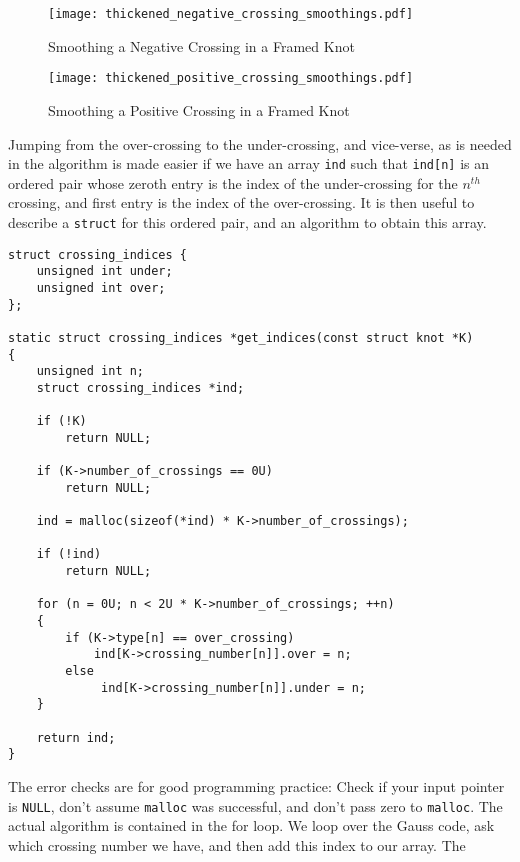 \documentclass{article}
\theoremstyle{plain}
\begin{document}
        \begin{figure}
            \centering
            \texttt{[image: thickened\_negative\_crossing\_smoothings.pdf]}
            \caption{Smoothing a Negative Crossing in a Framed Knot}
            \label{fig:thickened_negative_crossing_smoothings}
        \end{figure}
        \begin{figure}
            \centering
            \texttt{[image: thickened\_positive\_crossing\_smoothings.pdf]}
            \caption{Smoothing a Positive Crossing in a Framed Knot}
            \label{fig:thickened_positive_crossing_smoothings}
        \end{figure}
        Jumping from the over-crossing to the under-crossing, and vice-verse,
        as is needed in the algorithm is made easier if we have an array
        \texttt{ind} such that \texttt{ind[n]} is an ordered pair whose
        zeroth entry is the index of the under-crossing for the $n^{th}$
        crossing, and first entry is the index of the over-crossing. It is then
        useful to describe a \texttt{struct} for this ordered pair, and an
        algorithm to obtain this array.
\begin{lstlisting}[style=CStyle]
struct crossing_indices {
    unsigned int under;
    unsigned int over;
};

static struct crossing_indices *get_indices(const struct knot *K)
{
    unsigned int n;
    struct crossing_indices *ind;

    if (!K)
        return NULL;

    if (K->number_of_crossings == 0U)
        return NULL;

    ind = malloc(sizeof(*ind) * K->number_of_crossings);

    if (!ind)
        return NULL;

    for (n = 0U; n < 2U * K->number_of_crossings; ++n)
    {
        if (K->type[n] == over_crossing)
            ind[K->crossing_number[n]].over = n;
        else
             ind[K->crossing_number[n]].under = n;
    }

    return ind;
}
\end{lstlisting}
        The error checks are for good programming practice: Check if your
        input pointer is \texttt{NULL}, don't assume \texttt{malloc} was
        successful, and don't pass zero to \texttt{malloc}. The actual algorithm
        is contained in the for loop. We loop over the Gauss code, ask which
        crossing number we have, and then add this index to our array. The
\end{document}
